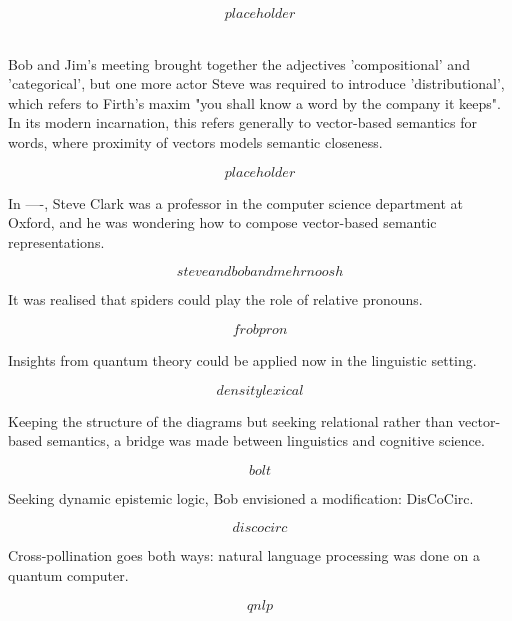 \[placeholder\]

\\

Bob and Jim's meeting brought together the adjectives 'compositional' and 'categorical', but one more actor Steve was required to introduce 'distributional', which refers to Firth's maxim \citep{} "you shall know a word by the company it keeps". In its modern incarnation, this refers generally to vector-based semantics for words, where proximity of vectors models semantic closeness.

\[placeholder\]

In ----, Steve Clark was a professor in the computer science department at Oxford, and he was wondering how to compose vector-based semantic representations.

\[steve and bob and mehrnoosh\]

It was realised that spiders could play the role of relative pronouns.

\[frobpron\]

Insights from quantum theory could be applied now in the linguistic setting.

\[density lexical\]

Keeping the structure of the diagrams but seeking relational rather than vector-based semantics, a bridge was made between linguistics and cognitive science.

\[bolt\]

Seeking dynamic epistemic logic, Bob envisioned a modification: DisCoCirc.

\[discocirc\]

Cross-pollination goes both ways: natural language processing was done on a quantum computer.

\[qnlp\]


    